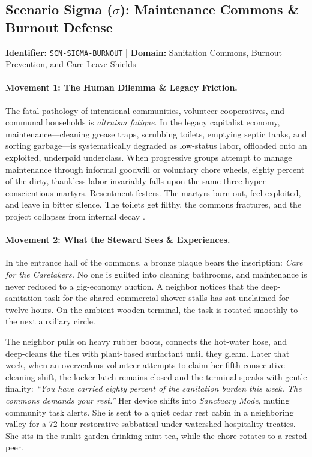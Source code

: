 \subsection{Scenario Sigma (\texorpdfstring{$\sigma$}{Sigma}): Maintenance Commons \& Burnout Defense}
\label{subsec:scn_sigma}
\textbf{Identifier:} \texttt{SCN-SIGMA-BURNOUT} \quad | \quad \textbf{Domain:} Sanitation Commons, Burnout Prevention, and Care Leave Shields

\paragraph{Movement 1: The Human Dilemma \& Legacy Friction.}
The fatal pathology of intentional communities, volunteer cooperatives, and communal households is \textit{altruism fatigue}. In the legacy capitalist economy, maintenance---cleaning grease traps, scrubbing toilets, emptying septic tanks, and sorting garbage---is systematically degraded as low-status labor, offloaded onto an exploited, underpaid underclass. When progressive groups attempt to manage maintenance through informal goodwill or voluntary chore wheels, eighty percent of the dirty, thankless labor invariably falls upon the same three hyper-conscientious martyrs. Resentment festers. The martyrs burn out, feel exploited, and leave in bitter silence. The toilets get filthy, the commons fractures, and the project collapses from internal decay \parencite{freeman1972}.

\paragraph{Movement 2: What the Steward Sees \& Experiences.}
In the entrance hall of the commons, a bronze plaque bears the inscription: \textit{Care for the Caretakers.} No one is guilted into cleaning bathrooms, and maintenance is never reduced to a gig-economy auction. A neighbor notices that the deep-sanitation task for the shared commercial shower stalls has sat unclaimed for twelve hours. On the ambient wooden terminal, the task is rotated smoothly to the next auxiliary circle. 

The neighbor pulls on heavy rubber boots, connects the hot-water hose, and deep-cleans the tiles with plant-based surfactant until they gleam. Later that week, when an overzealous volunteer attempts to claim her fifth consecutive cleaning shift, the locker latch remains closed and the terminal speaks with gentle finality: \textit{``You have carried eighty percent of the sanitation burden this week. The commons demands your rest.''} Her device shifts into \textit{Sanctuary Mode}, muting community task alerts. She is sent to a quiet cedar rest cabin in a neighboring valley for a 72-hour restorative sabbatical under watershed hospitality treaties. She sits in the sunlit garden drinking mint tea, while the chore rotates to a rested peer.

